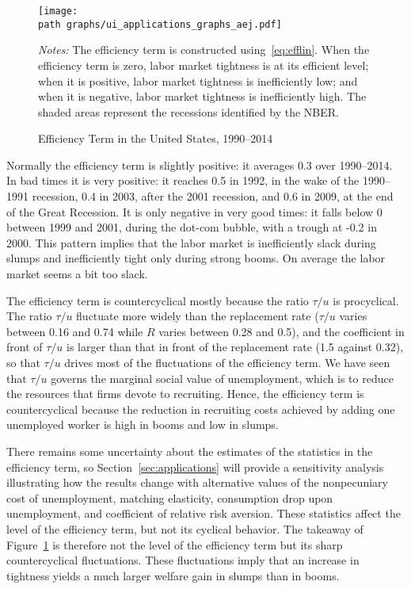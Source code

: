 \documentclass[letterpaper,12pt,leqno]{article}
\def\path{../}
\newcommand{\fignotes}[1]{\centering\parbox[c]{\textwidth}{\footnotesize \textit{Notes:} #1}}
\begin{document}
\begin{figure}[t] \centering
\texttt{[image: \\path graphs/ui\_applications\_graphs\_aej.pdf]}
\caption{Efficiency Term in the United States, 1990--2014}
\fignotes{The efficiency term is constructed using~\eqref{eq:efflin}. When the efficiency term is zero, labor market tightness is at its efficient level; when it is positive, labor market tightness is inefficiently low; and when it is negative, labor market tightness is inefficiently high. The shaded areas represent the recessions identified by the NBER.}
\label{fig:efficiency}\end{figure}

Normally the efficiency term is slightly positive: it averages 0.3 over 1990--2014. In bad times it is very positive: it reaches 0.5 in 1992, in the wake of the 1990--1991 recession, 0.4 in 2003,  after the 2001 recession, and 0.6 in 2009, at the end of the Great Recession. It is only negative in very good times: it falls below 0 between 1999 and 2001, during the dot-com bubble, with a trough at -0.2 in 2000. This pattern implies that the labor market is inefficiently slack during slumps and inefficiently tight only during strong booms. On average the labor market seems a bit too slack.

The efficiency term is countercyclical mostly because the ratio $\tau/u$ is procyclical. The ratio $\tau/u$ fluctuate more widely than the replacement rate ($\tau/u$ varies between 0.16 and 0.74 while $R$ varies between 0.28 and 0.5), and the coefficient in front of $\tau/u$ is larger than that in front of the replacement rate (1.5 against 0.32), so that $\tau/u$ drives most of the fluctuations of the efficiency term. We have seen that $\tau/u$ governs the marginal social value of unemployment, which is to reduce the resources that firms devote to recruiting. Hence, the efficiency term is countercyclical because the reduction in recruiting costs achieved by adding one unemployed worker is high in booms and low in slumps.

There remains some uncertainty about the estimates of the statistics in the efficiency term, so Section~\ref{sec:applications} will provide a sensitivity analysis illustrating how the results change with alternative values of the nonpecuniary cost of unemployment, matching elasticity, consumption drop upon unemployment, and coefficient of relative risk aversion. These statistics affect the level of the efficiency term, but not its cyclical behavior. The takeaway of Figure~\ref{fig:efficiency} is therefore not the level of the efficiency term but its sharp countercyclical fluctuations. These fluctuations imply that an increase in tightness yields a much larger welfare gain in slumps than in booms.
\end{document}
